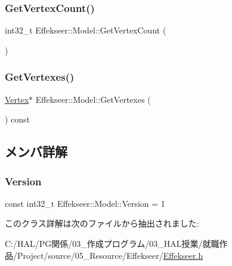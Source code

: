 \mbox{\label{class_effekseer_1_1_model_a25684a2a6e818195bc8b65cb5d74256c}} 
\subsubsection{\texorpdfstring{Get\+Vertex\+Count()}{GetVertexCount()}}
{\footnotesize\ttfamily int32\+\_\+t Effekseer\+::\+Model\+::\+Get\+Vertex\+Count (\begin{DoxyParamCaption}{ }\end{DoxyParamCaption})\hspace{0.3cm}{\ttfamily [inline]}}

\mbox{\label{class_effekseer_1_1_model_a778016ed6ce14ce790a5d8515ea0f62a}} 
\subsubsection{\texorpdfstring{Get\+Vertexes()}{GetVertexes()}}
{\footnotesize\ttfamily \mbox{\hyperlink{struct_effekseer_1_1_model_1_1_vertex}{Vertex}}$\ast$ Effekseer\+::\+Model\+::\+Get\+Vertexes (\begin{DoxyParamCaption}{ }\end{DoxyParamCaption}) const\hspace{0.3cm}{\ttfamily [inline]}}



\subsection{メンバ詳解}
\mbox{\label{class_effekseer_1_1_model_a9f5c2f10fde65efeb5bc603ed9d6436e}} 
\subsubsection{\texorpdfstring{Version}{Version}}
{\footnotesize\ttfamily const int32\+\_\+t Effekseer\+::\+Model\+::\+Version = 1\hspace{0.3cm}{\ttfamily [static]}}



このクラス詳解は次のファイルから抽出されました\+:\begin{DoxyCompactItemize}
\item 
C\+:/\+H\+A\+L/\+P\+G関係/03\+\_\+作成プログラム/03\+\_\+\+H\+A\+L授業/就職作品/\+Project/source/05\+\_\+\+Resource/\+Effekseer/\mbox{\hyperlink{_effekseer_8h}{Effekseer.\+h}}\end{DoxyCompactItemize}
